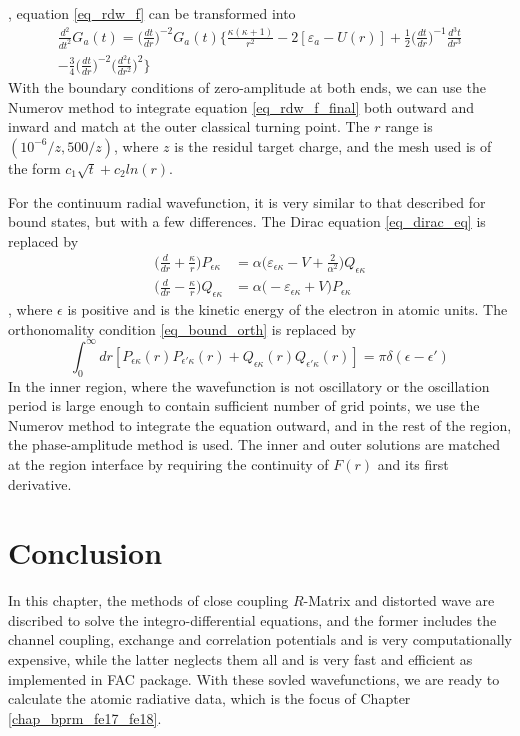 , equation \ref{eq_rdw_f} can be transformed into
\begin{multline} \label{eq_rdw_f_final}
	\frac{d^2}{dt^2}G_a(t) = \Bigg( \frac{dt}{dr}\Bigg)^{-2} G_a(t) \Bigg\{ \frac{\kappa(\kappa+1)}{r^2} - 2[\varepsilon_a - U(r)] + \frac{1}{2}\Bigg( \frac{dt}{dr}\Bigg)^{-1} \frac{d^3t}{dr^3} \\ - \frac{3}{4} \Bigg( \frac{dt}{dr}\Bigg)^{-2} \Bigg( \frac{d^2t}{dr^2}\Bigg)^2	\Bigg\}
\end{multline}
With the boundary conditions of zero-amplitude at both ends, we can use the Numerov method to integrate equation \ref{eq_rdw_f_final} both outward and inward and match at the outer classical turning point. The $r$ range is $(10^{-6}/z, 500/z)$, where $z$ is the residul target charge, and the mesh used is of the form $c_1\sqrt{t}+c_2ln(r)$.

For the continuum radial wavefunction, it is very similar to that described for bound states, but with a few differences. The Dirac equation \ref{eq_dirac_eq} is replaced by
\begin{equation}
\begin{split}
\Bigg( \frac{d}{dr} + \frac{\kappa}{r} \Bigg) P_{\epsilon\kappa} &= \alpha \Bigg( \varepsilon_{\epsilon\kappa} - V + \frac{2}{\alpha ^2} \Bigg) Q_{\epsilon\kappa} \\
\Bigg( \frac{d}{dr} - \frac{\kappa}{r} \Bigg) Q_{\epsilon\kappa} &= \alpha \Bigg( - \varepsilon_{\epsilon\kappa} + V \Bigg) P_{\epsilon\kappa}
\end{split}
\end{equation}
, where $\epsilon$ is positive and is the kinetic energy of the electron in atomic units. The orthonomality condition \ref{eq_bound_orth} is replaced by
\begin{equation} 
\int_0^\infty dr [P_{\epsilon\kappa}(r)P_{\epsilon'\kappa}(r) + Q_{\epsilon\kappa}(r)Q_{\epsilon'\kappa}(r)] =\pi \delta(\epsilon - \epsilon')
\end{equation}
In the inner region, where the wavefunction is not oscillatory or the oscillation period is large enough to contain sufficient number of grid points, we use the Numerov method to integrate the equation outward, and in the rest of the region, the phase-amplitude method is used. The inner and outer solutions are matched at the region interface by requiring the continuity of $F(r)$ and its first derivative.

\section{Conclusion}
In this chapter, the methods of close coupling $R$-Matrix and distorted wave are discribed to solve the integro-differential equations, and the former includes the channel coupling, exchange and correlation potentials and is very computationally expensive, while the latter neglects them all and is very fast and efficient as implemented in FAC package. With these sovled wavefunctions, we are ready to calculate the atomic radiative data, which is the focus of Chapter \ref{chap_bprm_fe17_fe18}.







